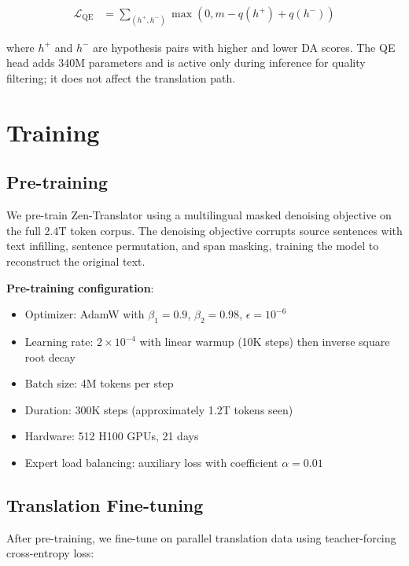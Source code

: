 \documentclass[11pt,twocolumn]{article}
\begin{document}
\begin{align}
  \mathcal{L}_{\text{QE}} &= \sum_{(h^+, h^-)} \max(0, m - q(h^+) + q(h^-))
\end{align}

where $h^+$ and $h^-$ are hypothesis pairs with higher and lower DA scores.
The QE head adds 340M parameters and is active only during inference for
quality filtering; it does not affect the translation path.

\section{Training}
\label{sec:training}

\subsection{Pre-training}

We pre-train Zen-Translator using a multilingual masked denoising objective
\citep{lewis2020bart} on the full 2.4T token corpus. The denoising objective
corrupts source sentences with text infilling, sentence permutation, and
span masking, training the model to reconstruct the original text.

\textbf{Pre-training configuration}:
\begin{itemize}[leftmargin=*,noitemsep]
  \item Optimizer: AdamW with $\beta_1 = 0.9$, $\beta_2 = 0.98$, $\epsilon = 10^{-6}$
  \item Learning rate: $2 \times 10^{-4}$ with linear warmup (10K steps) then
        inverse square root decay
  \item Batch size: 4M tokens per step
  \item Duration: 300K steps (approximately 1.2T tokens seen)
  \item Hardware: 512 H100 GPUs, 21 days
  \item Expert load balancing: auxiliary loss with coefficient $\alpha = 0.01$
\end{itemize}

\subsection{Translation Fine-tuning}

After pre-training, we fine-tune on parallel translation data using
teacher-forcing cross-entropy loss:
\end{document}
